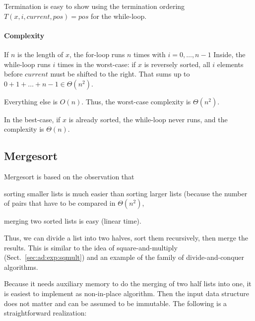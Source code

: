 Termination is easy to show using the termination ordering $T(x,i,current,pos)=pos$ for the while-loop.

\paragraph{Complexity}
If $n$ is the length of $x$, the for-loop runs $n$ times with $i=0,\ldots,n-1$
Inside, the while-loop runs $i$ times in the worst-case: if $x$ is reversely sorted, all $i$ elements before $current$ must be shifted to the right.
That sums up to $0+1+\ldots+n-1\in \Theta(n^2)$.

Everything else is $O(n)$.
Thus, the worst-case complexity is $\Theta(n^2)$.

In the best-case, if $x$ is already sorted, the while-loop never runs, and the complexity is $\Theta(n)$.

\subsection{Mergesort}

Mergesort is based on the observation that
\begin{compactitem}
  \item sorting smaller lists is much easier than sorting larger lists (because the number of pairs that have to be compared in $\Theta(n^2)$,
  \item merging two sorted lists is easy (linear time).
\end{compactitem}
Thus, we can divide a list into two halves, sort them recursively, then merge the results.
This is similar to the idea of square-and-multiply (Sect.~\ref{sec:ad:exp:sqmult}) and an example of the family of divide-and-conquer algorithms.

Because it needs auxiliary memory to do the merging of two half lists into one, it is easiest to implement as non-in-place algorithm.
Then the input data structure does not matter and can be assumed to be immutable.
The following is a straightforward realization:

